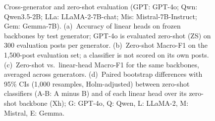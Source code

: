 \begin{figure}[t]
\caption{Cross-generator and zero-shot evaluation (GPT: GPT-4o; Qwn: Qwen3.5-2B; LLa: LLaMA-2-7B-chat; Mis: Mistral-7B-Instruct; Gem: Gemma-7B). (a)~Accuracy of linear heads on frozen backbones by test generator; GPT-4o is evaluated zero-shot (ZS) on 300 evaluation posts per generator. (b)~Zero-shot Macro-F1 on the 1{,}500-post evaluation set; a classifier is not scored on its own posts. (c)~Zero-shot vs.\ linear-head Macro-F1 for the same backbones, averaged across generators. (d)~Paired bootstrap differences with 95\% CIs (1{,}000 resamples, Holm-adjusted) between zero-shot classifiers (A-B: A minus B) and of each linear head over its zero-shot backbone (Xh); G: GPT-4o, Q: Qwen, L: LLaMA-2, M: Mistral, E: Gemma.}
\label{fig:generators}
\vspace{-0.3cm}
\end{figure}